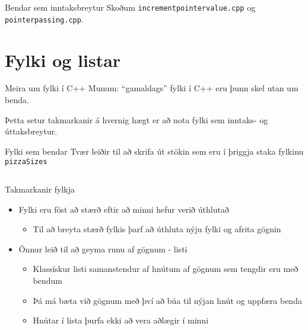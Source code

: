 \documentclass{beamer}
\begin{document}
\begin{frame}{Bendar sem inntaksbreytur}
    Skoðum \texttt{incrementpointervalue.cpp} og \texttt{pointerpassing.cpp}.
\end{frame}

\section{Fylki og listar}

\begin{frame}{Meira um fylki í C++}
    Munum: ``gamaldags'' fylki í C++ eru þunn skel utan um benda.

    Þetta setur takmarkanir á hvernig hægt er að nota fylki sem inntaks- og úttaksbreytur.
\end{frame}

\begin{frame}{Fylki sem bendar}
    Tvær leiðir til að skrifa út stökin sem eru í þriggja staka fylkinu \texttt{pizzaSizes}
    \begin{columns}
    \end{columns}
\end{frame}

\begin{frame}{Takmarkanir fylkja}
    \begin{itemize}
        \item Fylki eru föst að stærð eftir að minni hefur verið úthlutað
        \begin{itemize}
            \item Til að breyta stærð fylkis þarf að úthluta nýju fylki og afrita gögnin
        \end{itemize}
        \item Önnur leið til að geyma runu af gögnum - listi
        \begin{itemize}
            \item Klassískur listi samanstendur af hnútum  af gögnum sem tengdir eru með bendum
            \item Þá má bæta við gögnum með því að búa til nýjan hnút og uppfæra benda
            \item Hnútar í lista þurfa ekki að vera aðlægir í minni
        \end{itemize}
    \end{itemize}
\end{frame}
\end{document}
